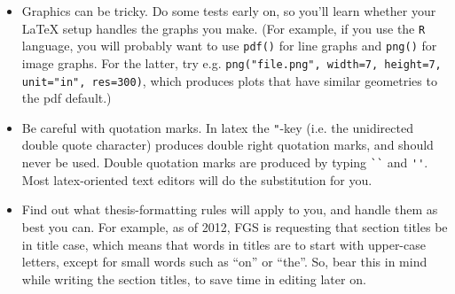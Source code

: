 \begin{itemize}
    \item Graphics can be tricky. Do some tests early on, so you'll learn
        whether your LaTeX setup handles the graphs you make.  (For example, if
        you use the \texttt{R} language, you will probably want to use
        \texttt{pdf()} for line graphs and \texttt{png()} for image graphs.
        For the latter, try e.g.  \texttt{png("file.png", width=7, height=7,
        unit="in", res=300)}, which produces plots that have similar geometries
        to the pdf default.)

    \item Be careful with quotation marks. In latex the \verb|"|-key (i.e. the
        unidirected double quote character) produces double right quotation
        marks, and should never be used. Double quotation marks are produced by
        typing \verb|``| and \verb|''|. Most latex-oriented text editors will
        do the substitution for you.

    \item Find out what thesis-formatting rules will apply to you, and handle
        them as best you can.  For example, as of 2012, FGS is requesting that
        section titles be in title case, which means that words in titles are
        to start with upper-case letters, except for small words such as ``on''
        or ``the''.  So, bear this in mind while writing the section titles, to
        save time in editing later on.

\end{itemize}
